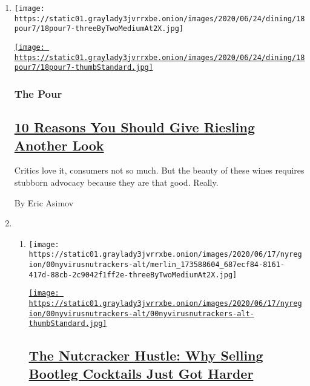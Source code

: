 \begin{enumerate}
\def\labelenumi{\arabic{enumi}.}
\item
  \texttt{[image: https://static01.graylady3jvrrxbe.onion/images/2020/06/24/dining/18pour7/18pour7-threeByTwoMediumAt2X.jpg]}

  \href{/2020/06/18/dining/drinks/dry-riesling.html}{\texttt{[image: https://static01.graylady3jvrrxbe.onion/images/2020/06/24/dining/18pour7/18pour7-thumbStandard.jpg]}}

  \hypertarget{the-pour}{%
  \subsubsection{The Pour}\label{the-pour}}

  \hypertarget{10-reasons-you-should-give-riesling-another-look}{%
  \subsection{\texorpdfstring{\href{/2020/06/18/dining/drinks/dry-riesling.html}{10
  Reasons You Should Give Riesling Another
  Look}}{10 Reasons You Should Give Riesling Another Look}}\label{10-reasons-you-should-give-riesling-another-look}}

  Critics love it, consumers not so much. But the beauty of these wines
  requires stubborn advocacy because they are that good. Really.

  By Eric Asimov
\item
  \begin{enumerate}
  \def\labelenumii{\arabic{enumii}.}
  \item
    \texttt{[image: https://static01.graylady3jvrrxbe.onion/images/2020/06/17/nyregion/00nyvirusnutrackers-alt/merlin\_173588604\_687ecf84-8161-417d-88cb-2c9042f1ff2e-threeByTwoMediumAt2X.jpg]}

    \href{/2020/06/20/nyregion/coronavirus-nutcrackers-cocktails-nyc.html}{\texttt{[image: https://static01.graylady3jvrrxbe.onion/images/2020/06/17/nyregion/00nyvirusnutrackers-alt/00nyvirusnutrackers-alt-thumbStandard.jpg]}}

    \hypertarget{the-nutcracker-hustle-why-selling-bootleg-cocktails-just-got-harder}{%
    \subsection{\texorpdfstring{\href{/2020/06/20/nyregion/coronavirus-nutcrackers-cocktails-nyc.html}{The
    Nutcracker Hustle: Why Selling Bootleg Cocktails Just Got
    Harder}}{The Nutcracker Hustle: Why Selling Bootleg Cocktails Just Got Harder}}\label{the-nutcracker-hustle-why-selling-bootleg-cocktails-just-got-harder}}


\end{enumerate}
\end{enumerate}
